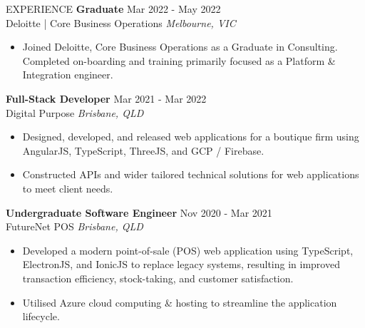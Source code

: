 \documentclass{resume} %
\begin{document}
\begin{rSection}{EXPERIENCE}
 \textbf{Graduate} \hfill Mar 2022 - May 2022\\
Deloitte | Core Business Operations \hfill \textit{Melbourne, VIC}
 \begin{itemize}
    \itemsep -3pt {} 
    \item Joined Deloitte, Core Business Operations as a Graduate in Consulting. Completed on-boarding and training primarily focused as a Platform \& Integration engineer.
 \end{itemize}

\newpage

\textbf{Full-Stack Developer} \hfill Mar 2021 - Mar 2022\\
Digital Purpose \hfill \textit{Brisbane, QLD}
 \begin{itemize}
    \itemsep -3pt {} 
    \item Designed, developed, and released web applications for a boutique firm using AngularJS, TypeScript, ThreeJS, and GCP / Firebase.
    \item Constructed APIs and wider tailored technical solutions for web applications to meet client needs.
 \end{itemize}

\textbf{Undergraduate Software Engineer} \hfill Nov 2020 - Mar 2021\\
FutureNet POS \hfill \textit{Brisbane, QLD}
 \begin{itemize}
    \itemsep -3pt {} 
    \item Developed a modern point-of-sale (POS) web application using TypeScript, ElectronJS, and IonicJS to replace legacy systems, resulting in improved transaction efficiency, stock-taking, and customer satisfaction.
    \item Utilised Azure cloud computing \& hosting to streamline the application lifecycle.
 \end{itemize}

\end{rSection} 
\end{document}
